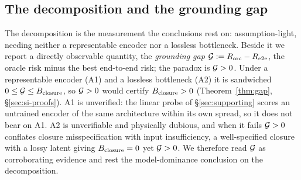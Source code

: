 \subsection{The decomposition and the grounding gap}
\label{sec:si-gap}
\label{sec:gap}
The decomposition is the measurement the conclusions rest on: assumption-light, needing neither a
representable encoder nor a lossless bottleneck. Beside it we report a directly observable quantity,
the \emph{grounding gap} $\mathcal{G}:=R_{\mathrm{orc}}-R_{\mathrm{e2e}}$, the oracle risk minus the best
end-to-end risk; the paradox is $\mathcal{G}>0$. Under a representable encoder (A1) and a lossless
bottleneck (A2) it is sandwiched $0\le\mathcal{G}\le B_{\mathrm{closure}}$, so $\mathcal{G}>0$ would certify $B_{\mathrm{closure}}>0$
(Theorem~\ref{thm:gap}, \S\ref{sec:si-proofs}). A1 is unverified: the linear probe of
\S\ref{sec:supporting} scores an untrained encoder of the same architecture within its own spread,
so it does not bear on A1. A2 is unverifiable and physically dubious, and when it fails $\mathcal{G}>0$
conflates closure misspecification with input insufficiency, a well-specified closure with a lossy
latent giving $B_{\mathrm{closure}}=0$ yet $\mathcal{G}>0$. We therefore read $\mathcal{G}$ as corroborating evidence and rest
the model-dominance conclusion on the decomposition.

%
